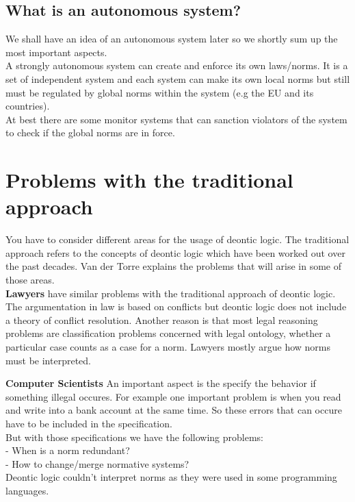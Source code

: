 \documentclass[conference]{hehe}
\begin{document}
\subsection{What is an autonomous system?}
We shall have an idea of an autonomous system later so we shortly sum up the most important aspects.\\

A strongly autonomous system can create and enforce its own laws/norms. It is a set of independent system and each system can make its own local norms but still must be regulated by global norms within the system (e.g the EU and its countries).\\
At best there are some monitor systems that can sanction violators of the system to check if the global norms are in force.\\


\section{Problems with the traditional approach}
You have to consider different areas for the usage of deontic logic. The traditional approach refers to the concepts of deontic logic which have been worked out over the past decades.  Van der Torre explains the problems that will arise in some of those areas.\\
\textbf{Lawyers} have similar problems with the traditional approach of deontic logic. The argumentation in law is based on conflicts but deontic logic does not include a theory of conflict resolution. Another reason is that most legal reasoning problems are classification problems concerned with legal ontology, whether a particular case counts as a case for a norm. Lawyers mostly argue how norms must be interpreted. \cite{b2}

\textbf{Computer Scientists}
An important aspect is the specify the behavior if something illegal occures. For example one important problem is when you read and write into a bank account at the same time. So these errors that can occure have to be included in the specification.\\
But with those specifications we have the following problems:\\
- When is a norm redundant?\\
- How to change/merge normative systems?\\
Deontic logic couldn't interpret norms as they were used in some programming languages.\\
\end{document}

